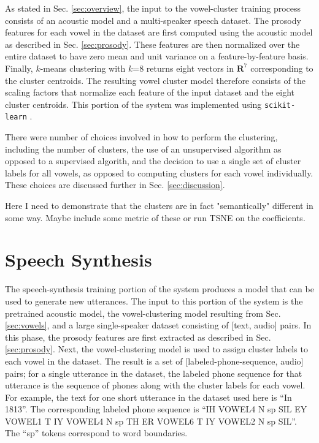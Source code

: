 \documentclass{article}
\begin{document}
As stated in Sec. \ref{sec:overview}, the input to the vowel-cluster training process consists of an acoustic model and a multi-speaker speech dataset.
The prosody features for each vowel in the dataset are first computed using the acoustic model as described in Sec. \ref{sec:prosody}.
These features are then normalized over the entire dataset to have zero mean and unit variance on a feature-by-feature basis.
Finally, $k$-means clustering with $k$=8 returns eight vectors in $\mathbf{R}^7$ corresponding to the cluster centroids.
The resulting vowel cluster model therefore consists of the scaling factors that normalize each feature of the input dataset and the eight cluster centroids. This portion of the system was implemented using \texttt{scikit-learn} \cite{scikit-learn}.

There were number of choices involved in how to perform the clustering, including the number of clusters, the use of an unsupervised algorithm as opposed to a supervised algorith, and the decision to use a single set of cluster labels for all vowels, as opposed to computing clusters for each vowel individually. These choices are discussed further in Sec. \ref{sec:discussion}.


Here I need to demonstrate that the clusters are in fact "semantically" different in some way. Maybe include some metric of these or run TSNE on the coefficients.

\section{Speech Synthesis}
\label{sec:tacotron}

The speech-synthesis training portion of the system produces a model that can be used to generate new utterances. The input to this portion of the system is the pretrained acoustic model, the vowel-clustering model resulting from Sec. \ref{sec:vowels}, and a large single-speaker dataset consisting of [text, audio] pairs.
In this phase, the prosody features are first extracted as described in Sec. \ref{sec:prosody}. Next, the vowel-clustering model is used to assign cluster labels to each vowel in the dataset.
The result is a set of [labeled-phone-sequence, audio] pairs; for a single utterance in the dataset, the labeled phone sequence for that utterance is the sequence of phones along with the cluster labels for each vowel. For example, the text for one short utterance in the dataset used here is ``In 1813''.
The corresponding labeled phone sequence is ``IH VOWEL4 N sp SIL EY VOWEL1 T IY VOWEL4 N sp TH ER VOWEL6 T IY VOWEL2 N sp SIL''. The ``sp'' tokens correspond to word boundaries.
\end{document}
